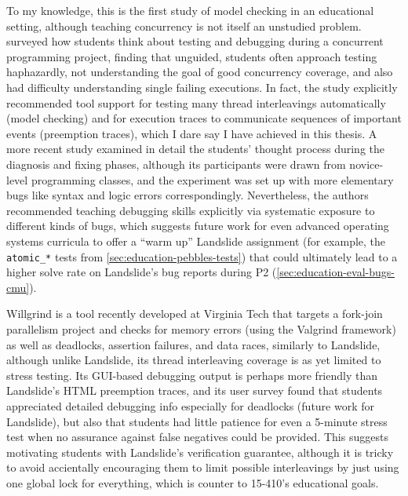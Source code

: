To my knowledge, this is the first study of model checking in an educational setting,
although teaching concurrency is not itself an unstudied problem.
%
\cite{how-studence} surveyed how students think about
testing and debugging during a concurrent programming project,
finding that unguided, students often approach testing haphazardly,
not understanding the goal of good concurrency coverage,
and also had difficulty understanding single failing executions.
In fact, the study explicitly recommended tool support for testing many thread interleavings automatically (model checking)
and for execution traces to communicate sequences of important events (preemption traces),
which I dare say I have achieved in this thesis.
A more recent study \cite{novices-programmers}
examined in detail the students' thought process
during the diagnosis and fixing phases,
although its participants were drawn from novice-level programming classes,
and the experiment was set up with more elementary bugs like syntax and logic errors correspondingly.
Nevertheless, the authors recommended teaching debugging skills explicitly
via systematic exposure to different kinds of bugs,
which suggests future work for even advanced operating systems curricula
to offer a ``warm up'' Landslide assignment
(for example, the {\tt atomic\_*} tests from \cref{sec:education-pebbles-tests})
that could ultimately lead to a higher solve rate on Landslide's bug reports during P2 (\cref{sec:education-eval-bugs-cmu}).

Willgrind \cite{willgrind} is a tool recently developed at Virginia Tech
that targets a fork-join parallelism project
and checks for memory errors (using the Valgrind \cite{valgrind} framework)
as well as deadlocks, assertion failures, and data races, similarly to Landslide,
although unlike Landslide, its thread interleaving coverage is as yet limited to stress testing.
Its GUI-based debugging output is perhaps more friendly than Landslide's HTML preemption traces,
and its user survey found that students appreciated detailed debugging info especially for deadlocks
(future work for Landslide),
but also that students had little patience for even a 5-minute stress test
when no assurance against false negatives could be provided.
This suggests motivating students with Landslide's verification guarantee,
although it is tricky to avoid accientally encouraging %
them to limit possible interleavings by just using one global lock for everything,
which is counter to 15-410's educational goals.

